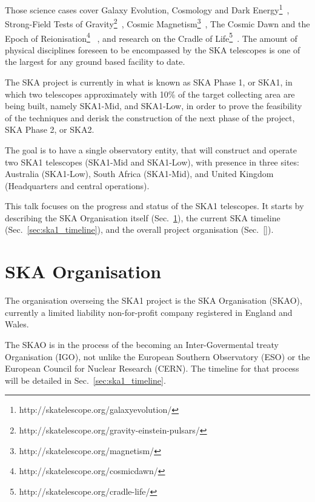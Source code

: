 \documentclass[a4paper,
               biblatex,       %
               keeplastbox,    %
               ]{jacow-2_1}    %
\begin{document}
Those science cases cover Galaxy Evolution, Cosmology and Dark Energy\footnote{http://skatelescope.org/galaxyevolution/}~\cite{2015aska.confE..67P, 2015aska.confE..16M, 2015aska.confE..51F}, Strong-Field Tests of Gravity\footnote{http://skatelescope.org/gravity-einstein-pulsars/}~\cite{2015aska.confE..36K}, Cosmic Magnetism\footnote{http://skatelescope.org/magnetism/}~\cite{2015aska.confE..92J}, The Cosmic Dawn and the Epoch of Reionisation\footnote{http://skatelescope.org/cosmicdawn/} ~\cite{2015aska.confE...1K}, and research on the Cradle of Life\footnote{http://skatelescope.org/cradle-life/}~\cite{2015aska.confE.115H}. The amount of physical disciplines foreseen to be encompassed by the SKA telescopes is one of the largest for any ground based facility to date.

The SKA project is currently in what is known as SKA Phase 1, or SKA1, in which two telescopes approximately with 10\% of the target collecting area are being built, namely SKA1-Mid, and SKA1-Low, in order to prove the feasibility of the techniques and derisk the construction of the next phase of the project, SKA Phase 2, or SKA2.

The goal is to have a single observatory entity, that will construct and operate two SKA1 telescopes (SKA1-Mid and SKA1-Low), with presence in three sites: Australia (SKA1-Low), South Africa (SKA1-Mid), and United Kingdom (Headquarters and central operations).

This talk focuses on the progress and status of the SKA1 telescopes. It starts by describing the SKA Organisation itself (Sec.~\ref{sec:ska_organisation}), the current SKA timeline (Sec.~\ref{sec:ska1_timeline}), and the overall project organisation (Sec.~\ref{}). 


\section{SKA Organisation} %
\label{sec:ska_organisation}
The organisation overseing the SKA1 project is the SKA Organisation (SKAO), currently a limited liability non-for-profit company registered in England and Wales.

The SKAO is in the process of the becoming an Inter-Govermental treaty Organisation (IGO), not unlike the European Southern Observatory (ESO) or the European Council for Nuclear Research (CERN). The timeline for that process will be detailed in Sec.~\ref{sec:ska1_timeline}.
\end{document}
